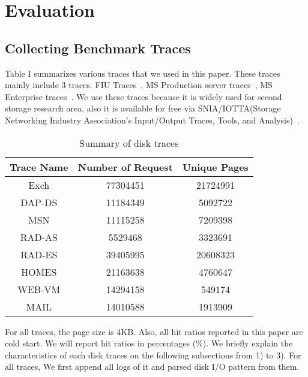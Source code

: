 \section{Evaluation}



\subsection{Collecting Benchmark Traces}\label{Trace}

Table I summarizes various traces that we used in this paper. These traces mainly include 3 traces. FIU Traces~\cite{fiu}, MS Production server traces~\cite{microsoft}, MS Enterprise traces~\cite{microsoft}. We use these traces because it is widely used for second storage research area, also it is available for free via SNIA/IOTTA(Storage Networking Industry Association's Input/Output Traces, Tools, and Analysis)~\cite{snia}.



\begin{table}[h]

\begin{center}
\begin{tabular}{|c|c|c|}
\hline
\textbf{Trace Name}&\textbf{Number of Request} & \textbf{Unique Pages} \\
\cline{2-3} 
\hline
Exch   & 77304451 & 21724991    \\ 
\hline
DAP-DS & 11184349 & 5092722   \\
MSN    & 11115258 & 7209398   \\
RAD-AS & 5529468 & 3323691   \\
RAD-ES & 39405995 & 20608323 \\        
\hline
HOMES  & 21163638  & 4760647 \\
WEB-VM & 14294158 & 549174 \\
MAIL   & 14010588 & 1913909 \\

\hline
\end{tabular}
\label{tab1}
\end{center}
\caption{Summary of disk traces}
\end{table}

For all traces, the page size is 4KB. Also, all hit ratios reported in this paper are cold start. We will report hit ratios in percentages (\%). We briefly explain the characteristics of each disk traces on the following subsections from 1) to 3). For all traces, We first append all logs of it and parsed disk I/O pattern from them.
\vspace{0.3cm}
